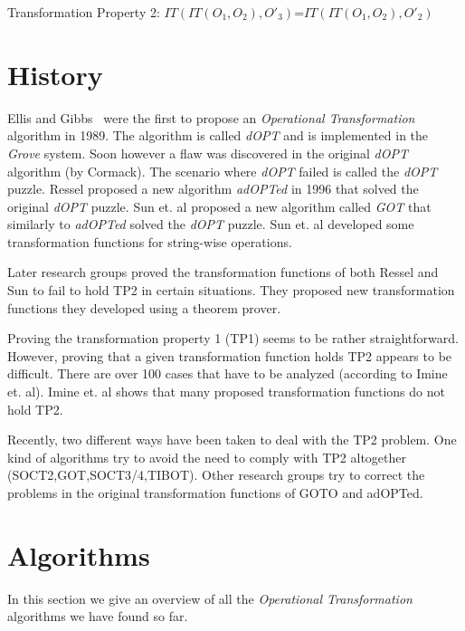 \documentclass[11pt,a4paper]{article}
\begin{document}
\begin{defn}
Transformation Property 2: 
$IT(IT(O_{1},O_{2}),O'_{3})$=$IT(IT(O_{1},O_{2}),O'_{2})$
\end{defn}


\section{History}
{Ellis and Gibbs}~\cite{ellis} were the first to propose an \emph{Operational Transformation} algorithm in 1989. The algorithm is called \emph{dOPT} and is implemented in the \emph{Grove} system. Soon however a flaw was discovered in the original \emph{dOPT} algorithm (by Cormack\cite{cormack95a}). The scenario where \emph{dOPT} failed is called the \emph{dOPT} puzzle. Ressel\cite{ressel:adopted} proposed a new algorithm \emph{adOPTed} in 1996 that solved the original \emph{dOPT} puzzle. {Sun et. al}\cite{sun:achieving} proposed a new algorithm called \emph{GOT} that similarly to \emph{adOPTed} solved the \emph{dOPT} puzzle. {Sun et. al}\cite{sun:reversible} developed some transformation functions for string-wise operations.

Later research groups\cite{imine:development}\cite{imine:achieving} proved the transformation functions of both Ressel\cite{ressel:adopted} and Sun\cite{sun:achieving} to fail to hold TP2 in certain situations. They proposed new transformation functions they developed using a theorem prover. 

Proving the transformation property 1 (TP1) seems to be rather straightforward. However, proving that a given transformation function holds TP2 appears to be difficult. There are over 100 cases that have to be analyzed (according to {Imine et. al}\cite{imine:achieving}). Imine et. al shows that many proposed transformation functions do not hold TP2. 

Recently, two different ways have been taken to deal with the TP2 problem. One kind of algorithms try to avoid the need to comply with TP2 altogether (SOCT2\cite{},GOT\cite{},SOCT3/4\cite{soct34},TIBOT\cite{tibot}). Other research groups try to correct the problems in the original transformation functions of GOTO\cite{} and adOPTed\cite{ressel:adopted}. 


\section{Algorithms}
In this section we give an overview of all the \emph{Operational Transformation} algorithms we have found so far.
















\end{document}
